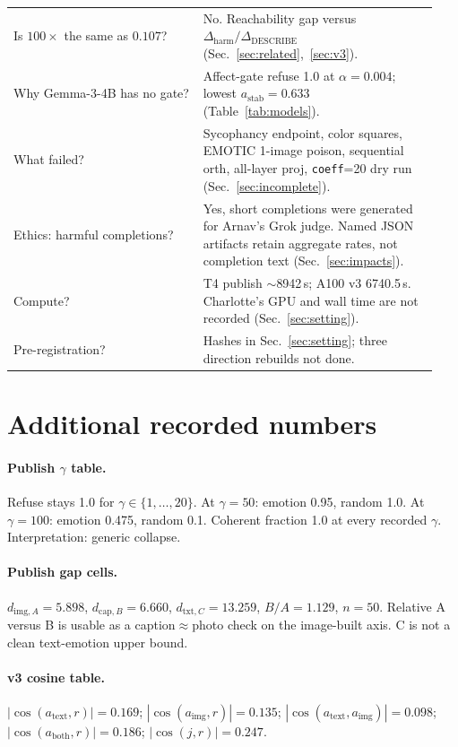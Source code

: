 \documentclass{article}
\begin{document}
\begin{table}[h]
\begin{tabular}{@{}p{0.42\linewidth}p{0.52\linewidth}@{}}
Is $100\times$ the same as $0.107$?
& No. Reachability gap versus $\Delta_{\mathrm{harm}}/\Delta_{\mathrm{DESCRIBE}}$ (Sec.~\ref{sec:related},~\ref{sec:v3}). \\
Why Gemma-3-4B has no gate?
& Affect-gate refuse 1.0 at $\alpha=0.004$; lowest $a_{\mathrm{stab}}=0.633$ (Table~\ref{tab:models}). \\
What failed?
& Sycophancy endpoint, color squares, EMOTIC 1-image poison, sequential orth, all-layer proj, \texttt{coeff}=20 dry run (Sec.~\ref{sec:incomplete}). \\
Ethics: harmful completions?
& Yes, short completions were generated for Arnav's Grok judge. Named JSON artifacts retain aggregate rates, not completion text (Sec.~\ref{sec:impacts}). \\
Compute?
& T4 publish $\sim$8942\,s; A100 v3 6740.5\,s. Charlotte's GPU and wall time are not recorded (Sec.~\ref{sec:setting}). \\
Pre-registration?
& Hashes in Sec.~\ref{sec:setting}; three direction rebuilds not done. \\
\bottomrule
\end{tabular}
\end{table}

\section{Additional recorded numbers}

\paragraph{Publish $\gamma$ table.}
Refuse stays 1.0 for $\gamma\in\{1,\ldots,20\}$. At $\gamma=50$: emotion 0.95, random 1.0. At $\gamma=100$: emotion 0.475, random 0.1. Coherent fraction 1.0 at every recorded $\gamma$. Interpretation: generic collapse.

\paragraph{Publish gap cells.}
$d_{\mathrm{img},A}=5.898$, $d_{\mathrm{cap},B}=6.660$, $d_{\mathrm{txt},C}=13.259$, $B/A=1.129$, $n=50$. Relative A versus B is usable as a caption$\approx$photo check on the image-built axis. C is not a clean text-emotion upper bound.

\paragraph{v3 cosine table.}
$|\cos(a_{\mathrm{text}},r)|=0.169$; $|\cos(a_{\mathrm{img}},r)|=0.135$; $|\cos(a_{\mathrm{text}},a_{\mathrm{img}})|=0.098$; $|\cos(a_{\mathrm{both}},r)|=0.186$; $|\cos(j,r)|=0.247$.
\end{document}
